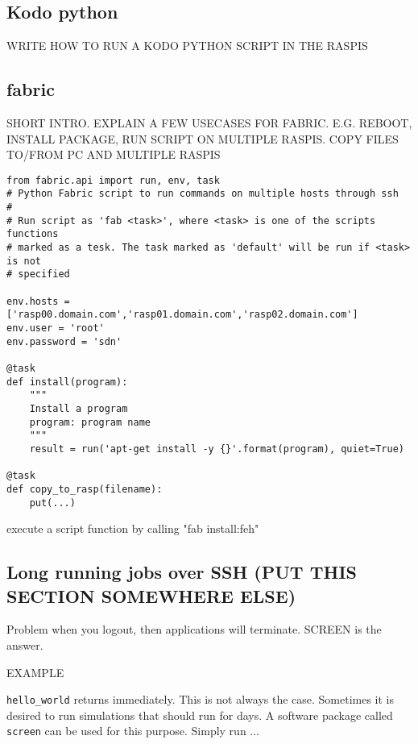 \subsection{Kodo python}

WRITE HOW TO RUN A KODO PYTHON SCRIPT IN THE RASPIS

\subsection{fabric}

SHORT INTRO. EXPLAIN A FEW USECASES FOR FABRIC. E.G. REBOOT, INSTALL PACKAGE, RUN SCRIPT ON MULTIPLE RASPIS. COPY FILES TO/FROM PC AND MULTIPLE RASPIS 


\begin{lstlisting}[]
from fabric.api import run, env, task
# Python Fabric script to run commands on multiple hosts through ssh
#
# Run script as 'fab <task>', where <task> is one of the scripts functions
# marked as a tesk. The task marked as 'default' will be run if <task> is not
# specified

env.hosts = ['rasp00.domain.com','rasp01.domain.com','rasp02.domain.com']
env.user = 'root'
env.password = 'sdn'

@task
def install(program):
    """
    Install a program
    program: program name
    """
    result = run('apt-get install -y {}'.format(program), quiet=True)

@task
def copy_to_rasp(filename):
    put(...)

\end{lstlisting}
\FloatBarrier

execute a script function by calling "fab install:feh"




\subsection{Long running jobs over SSH (PUT THIS SECTION SOMEWHERE ELSE)}

Problem when you logout, then applications will terminate. SCREEN is the answer.

EXAMPLE

\texttt{hello\_world} returns immediately. This is not always the case.
Sometimes it is desired to run simulations that should run for days. 
A software package called \texttt{screen} can be used for this purpose.
Simply run ...
